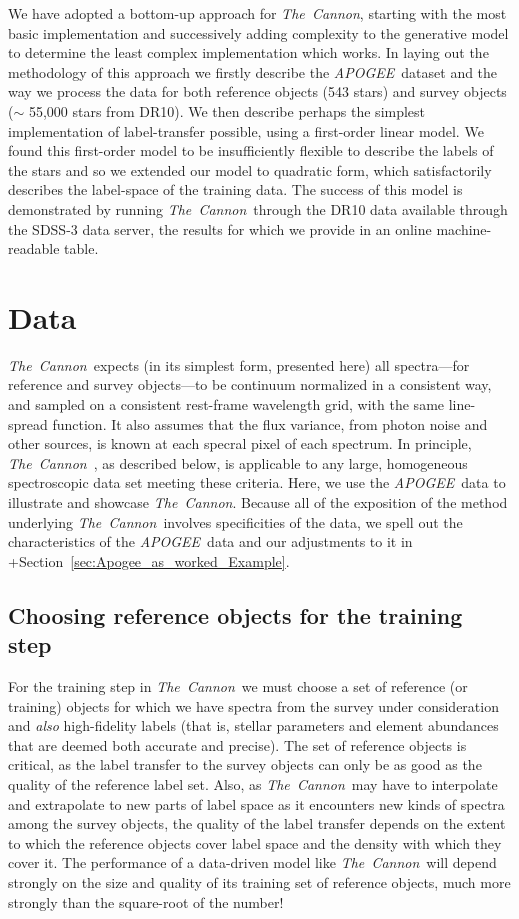 \documentclass[12pt, preprint]{aastex}
\newcommand{\sectionname}{Section}
\newcommand{\tc}{\textsl{The~Cannon}}
\newcommand{\apogee}{\textsl{APOGEE}}
\begin{document}
We have adopted a bottom-up approach for \tc, starting with the most basic implementation and successively adding complexity to the generative model to determine the least complex implementation which works.  
In laying out the methodology of this approach we firstly describe the \apogee\ dataset and the way we process the data for both reference objects (543 stars) and survey objects ($\sim$ 55,000 stars from DR10). 
We then describe perhaps the simplest implementation of label-transfer possible, using a first-order linear model. We found this first-order model to be insufficiently flexible to describe the labels of the stars and so we extended our model to quadratic form, which satisfactorily describes the label-space of the training data.
The success of this model is demonstrated by running \tc\ through the DR10 data available through the SDSS-3 data server, the results for which we provide in an online machine-readable table. %

\section{Data}\label{sec:Data}
\tc\ expects (in its simplest form, presented here)
all spectra---for reference and survey objects---to be continuum normalized in a consistent way,
and sampled on a consistent rest-frame wavelength grid, with the same line-spread function.
It also assumes that the flux variance, from photon noise and other sources, is known at each specral pixel of each spectrum.
In principle, \tc\ , as described below, is applicable to any large, homogeneous spectroscopic data set
meeting these criteria.
Here, we use the \apogee\ data \citep{Ahn2014} to illustrate and showcase \tc.
Because all of the exposition of the method underlying \tc\ involves specificities of the data,
we spell out the characteristics of the \apogee\ data and our adjustments to it in +\sectionname~\ref{sec:Apogee_as_worked_Example}.

\subsection{Choosing reference objects for the training step}
\label{sec:ReferenceObjects}

For the training step in \tc\ we must choose a set of reference (or training) objects for which we have spectra from the survey under consideration and \emph{also} high-fidelity labels (that is, stellar parameters and element abundances that are deemed both accurate and precise).
The set of reference objects is critical, as the label transfer to the survey objects can only be as good as the quality of the reference label set. 
Also, as \tc\ may have to interpolate and extrapolate to new parts of label space as
it encounters new kinds of spectra among the survey objects, the quality
of the label transfer depends on the extent to which the reference objects
cover label space and the density with which they cover it.
The performance of a data-driven model like \tc\ will depend strongly on the size and quality of its training set of reference objects, much more strongly than the square-root of the number!
\end{document}
